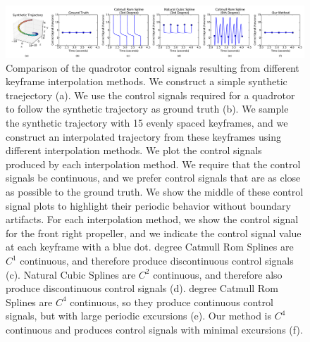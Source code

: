 \begin{figure}[th!]
  \centering
  \includegraphics[width=7.0in]{images/2015_siggraph_asia_supplementary/method_comparison}
  \caption{
Comparison of the quadrotor control signals resulting from different keyframe interpolation methods.
We construct a simple synthetic traejectory (a). We use the control signals required for a  quadrotor to follow the synthetic trajectory as ground truth (b).
We sample the synthetic trajectory with 15 evenly spaced keyframes, and we construct an interpolated trajectory from these keyframes using different interpolation methods.
We plot the control signals produced by each interpolation method. We require that the control signals be continuous, and we prefer control signals that are as close as possible to the ground truth. We show the middle of these control signal plots to highlight their periodic behavior without boundary artifacts.
For each interpolation method, we show the control signal for the front right propeller, and we indicate the control signal value at each keyframe with a blue dot.
 degree Catmull Rom Splines are $C^1$ continuous, and therefore produce discontinuous control signals (c).
Natural Cubic Splines are $C^2$ continuous, and therefore also produce discontinuous control signals (d).
 degree Catmull Rom Splines are $C^4$ continuous, so they produce continuous control signals, but with large periodic excursions (e).
Our method is $C^4$ continuous and produces control signals with minimal excursions (f). 
}
  \label{figure:method_comparison}
\end{figure}
%
